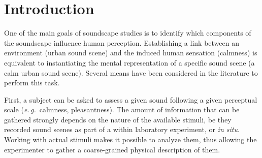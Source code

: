 \documentclass[12pt]{elsarticle}
\newcommand{\eg}{\emph{e.\,g.}}
\providecommand{\DIFadd}[1]{{\protect\color{blue}\uwave{#1}}} %
\providecommand{\DIFaddbegin}{} %
\providecommand{\DIFaddend}{} %
\begin{document}

\setlength{\parindent}{5ex}

\section{Introduction}
\label{sec:intro}


One of the main goals of soundscape studies is to identify which components of the soundscape influence human perception\DIFaddbegin \DIFadd{, see~}\DIFaddend \cite{aletta2016soundscape}. Establishing a link between an environment (urban sound scene) and the induced human sensation (calmness) is equivalent to instantiating the mental representation of a specific sound scene (a calm urban sound scene). Several means have been considered in the literature to perform this task.


First, a subject can be asked to assess a given sound following a given perceptual scale (\eg~calmness, pleasantness)\DIFaddbegin \DIFadd{, see~}\DIFaddend \cite{axelsson2005soundscape,davies2013perception,cain2013development}. The amount of information that can be gathered strongly depends on the nature of the available stimuli, be they recorded sound scenes as part of a within laboratory experiment, or \emph{in situ}. Working with actual stimuli makes it possible to analyze them, thus allowing the experimenter to gather a coarse-grained physical description of them.
\end{document}
